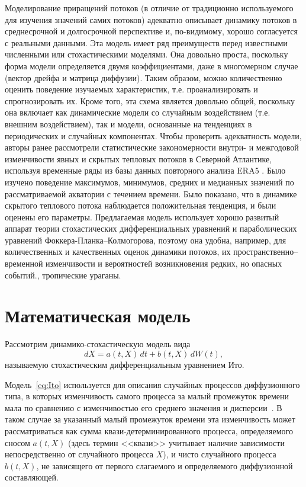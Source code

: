 Моделирование приращений потоков (в отличие от традиционно используемого для изучения значений самих потоков) адекватно описывает динамику потоков в среднесрочной и долгосрочной перспективе и, по-видимому, хорошо согласуется с реальными данными. Эта модель имеет ряд преимуществ перед известными численными или стохастическими моделями. Она довольно проста, поскольку форма модели определяется двумя коэффициентами, даже в многомерном случае (вектор дрейфа и матрица диффузии). Таким образом, можно количественно оценить поведение изучаемых характеристик, т.е. проанализировать и спрогнозировать их. Кроме того, эта схема является довольно общей, поскольку она включает как динамические модели со случайным воздействием (т.е. внешним воздействием), так и модели, основанные на тенденциях в периодических и случайных компонентах. Чтобы проверить адекватность модели, авторы ранее рассмотрели статистические закономерности внутри- и межгодовой изменчивости явных и скрытых тепловых потоков в Северной Атлантике, используя временные ряды из базы данных повторного анализа ERA5 \cite{FAO}. Было изучено поведение максимумов, минимумов, средних и медианных значений по рассматриваемой акватории с течением времени. Было показано, что в динамике скрытого теплового потока наблюдается положительная тенденция, и были оценены его параметры. Предлагаемая модель использует хорошо развитый аппарат теории стохастических дифференциальных уравнений и параболических уравнений Фоккера-Планка–Колмогорова, поэтому она удобна, например, для количественных и качественных оценок динамики потоков, их пространственно–временной изменчивости и вероятностей возникновения редких, но опасных событий., тропические ураганы.


\section{Математическая модель}
\label{sec:Model}

Рассмотрим динамико-стохастическую модель вида
\begin{equation}
	\label{eq:Ito}
	dX = a(t,X)\,dt + b(t, X)\,dW(t), 
\end{equation}
называемую стохастическим дифференциальным уравнением Ито.

Модель~\eqref{eq:Ito} используется для описания случайных процессов диффузионного типа, в которых изменчивость самого процесса за малый промежуток времени мала по сравнению с изменчивостью его среднего значения и дисперсии~\cite{jin2020controls,van2021characterisation}. В таком случае за указанный малый промежуток времени эта изменчивость может рассматриваться как сумма квази-детерминированного процесса, определяемого сносом $a(t, X)$ (здесь термин <<квази>> учитывает наличие зависимости непосредственно от случайного процесса $X$), и чисто случайного процесса $b(t, X)$, не зависящего от первого слагаемого и определяемого диффузионной составляющей.

